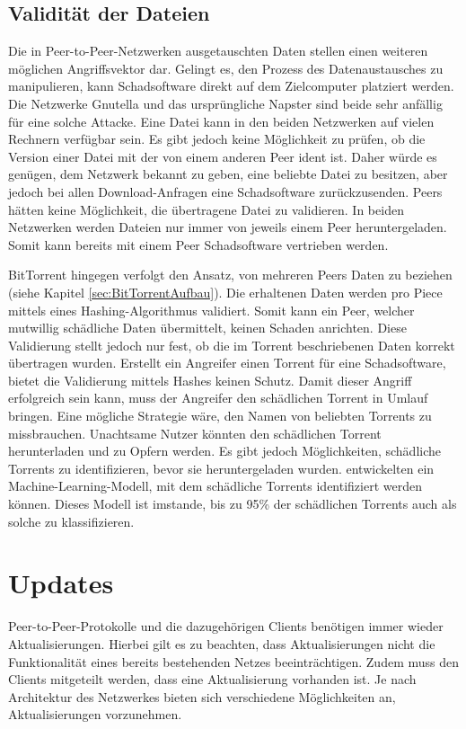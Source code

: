 \subsection{Validität der Dateien}
Die in Peer-to-Peer-Netzwerken ausgetauschten Daten stellen einen weiteren möglichen Angriffsvektor dar. Gelingt es, den Prozess des Datenaustausches zu manipulieren, kann Schadsoftware direkt auf dem Zielcomputer platziert werden. Die Netzwerke Gnutella und das ursprüngliche Napster sind beide sehr anfällig für eine solche Attacke. Eine Datei kann in den beiden Netzwerken auf vielen Rechnern verfügbar sein. Es gibt jedoch keine Möglichkeit zu prüfen, ob die Version einer Datei mit der von einem anderen Peer ident ist. Daher würde es genügen, dem Netzwerk bekannt zu geben, eine beliebte Datei zu besitzen, aber jedoch bei allen Download-Anfragen eine Schadsoftware zurückzusenden. Peers hätten keine Möglichkeit, die übertragene Datei zu validieren. In beiden Netzwerken werden Dateien nur immer von jeweils einem Peer heruntergeladen. Somit kann bereits mit einem Peer Schadsoftware vertrieben werden. 

BitTorrent hingegen verfolgt den Ansatz, von mehreren Peers Daten zu beziehen (siehe Kapitel \ref{sec:BitTorrentAufbau}). Die erhaltenen Daten werden pro Piece mittels eines Hashing-Algorithmus validiert. Somit kann ein Peer, welcher mutwillig schädliche Daten übermittelt, keinen Schaden anrichten. Diese Validierung stellt jedoch nur fest, ob die im Torrent beschriebenen Daten korrekt übertragen wurden. Erstellt ein Angreifer einen Torrent für eine Schadsoftware, bietet die Validierung mittels Hashes keinen Schutz. Damit dieser Angriff erfolgreich sein kann, muss der Angreifer den schädlichen Torrent in Umlauf bringen. Eine mögliche Strategie wäre, den Namen von beliebten Torrents zu missbrauchen. Unachtsame Nutzer könnten den schädlichen Torrent herunterladen und zu Opfern werden. Es gibt jedoch Möglichkeiten, schädliche Torrents zu identifizieren, bevor sie heruntergeladen wurden. \textcite{blackstonepredict} entwickelten ein Machine-Learning-Modell, mit dem schädliche Torrents identifiziert werden können. Dieses Modell ist imstande, bis zu 95\% der schädlichen Torrents auch als solche zu klassifizieren.




\section{Updates}
Peer-to-Peer-Protokolle und die dazugehörigen Clients benötigen immer wieder Aktualisierungen. Hierbei gilt es zu beachten, dass Aktualisierungen nicht die Funktionalität eines bereits bestehenden Netzes beeinträchtigen. Zudem muss den Clients mitgeteilt werden, dass eine Aktualisierung vorhanden ist. Je nach Architektur des Netzwerkes bieten sich verschiedene Möglichkeiten an, Aktualisierungen vorzunehmen. 

